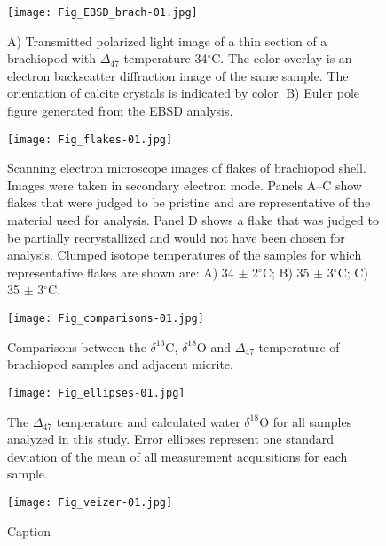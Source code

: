 \documentclass{article}
\newcommand{\deltao}{$\delta^{18}$}
\newcommand{\deltac}{$\delta^{13}$}
\newcommand{\degrees}{$^{\circ}$}
\begin{document}
\begin{figure}[htb]
\centering
\texttt{[image: Fig\_EBSD\_brach-01.jpg]}
\caption{A) Transmitted polarized light image of a thin section of a brachiopod with $\Delta_{47}$ temperature 34\degrees C. The color overlay is an electron backscatter diffraction image of the same sample. The orientation of calcite crystals is indicated by color. B) Euler pole figure generated from the EBSD analysis.}
\label{EBSD_brach}
\end{figure}

\begin{figure}[htb]
\centering
\texttt{[image: Fig\_flakes-01.jpg]}
\caption{Scanning electron microscope images of flakes of brachiopod shell. Images were taken in secondary electron mode. Panels A--C show flakes that were judged to be pristine and are representative of the material used for analysis. Panel D shows a flake that was judged to be partially recrystallized and would not have been chosen for analysis. Clumped isotope temperatures of the samples for which representative flakes are shown are: A) 34 $\pm$ 2\degrees C; B) 35 $\pm$ 3\degrees C; C) 35 $\pm$ 3\degrees C.}
\label{flakes}
\end{figure}

\begin{figure}[htb]
\centering
\texttt{[image: Fig\_comparisons-01.jpg]}
\caption{Comparisons between the \deltac C, \deltao O and $\Delta_{47}$ temperature of brachiopod samples and adjacent micrite.}
\label{comparisons}
\end{figure}

\begin{figure}[htb]
\centering
\texttt{[image: Fig\_ellipses-01.jpg]}
\caption{The $\Delta_{47}$ temperature and calculated water \deltao O for all samples analyzed in this study. Error ellipses represent one standard deviation of the mean of all measurement acquisitions for each sample.}
\label{ellipses}
\end{figure}

\begin{figure}[htb]
\centering
\texttt{[image: Fig\_veizer-01.jpg]}
\caption{Caption}
\label{veizer}
\end{figure}
\end{document}
